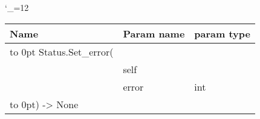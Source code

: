 \begingroup \catcode`\_=12 \tt
\begin{tabular}{lll}
\toprule
\textrm{Name}&\textrm{Param name}&\textrm{param type}\\
\midrule
\hbox to 0pt {Status.Set_error(\hss}\\
& self\\
& error & int\\
\hbox to 0pt{) -> None\hss}\\
\bottomrule
\end{tabular}
\endgroup
